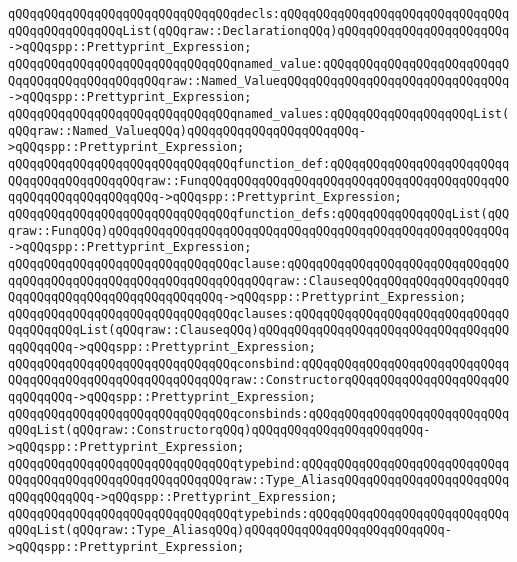 \verb|qQQqqQQqqQQqqQQqqQQqqQQqqQQqqQQqdecls:qQQqqQQqqQQqqQQqqQQqqQQqqQQqqQQqqQQqqQQqqQQqqQQqList(qQQqraw::DeclarationqQQq)qQQqqQQqqQQqqQQqqQQqqQQq->qQQqspp::Prettyprint_Expression;|\newline
\verb|qQQqqQQqqQQqqQQqqQQqqQQqqQQqqQQqnamed_value:qQQqqQQqqQQqqQQqqQQqqQQqqQQqqQQqqQQqqQQqqQQqqQQqraw::Named_ValueqQQqqQQqqQQqqQQqqQQqqQQqqQQqqQQq->qQQqspp::Prettyprint_Expression;|\newline
\verb|qQQqqQQqqQQqqQQqqQQqqQQqqQQqqQQqnamed_values:qQQqqQQqqQQqqQQqqQQqList(qQQqraw::Named_ValueqQQq)qQQqqQQqqQQqqQQqqQQqqQQq->qQQqspp::Prettyprint_Expression;|\newline
\verb|qQQqqQQqqQQqqQQqqQQqqQQqqQQqqQQqfunction_def:qQQqqQQqqQQqqQQqqQQqqQQqqQQqqQQqqQQqqQQqqQQqraw::FunqQQqqQQqqQQqqQQqqQQqqQQqqQQqqQQqqQQqqQQqqQQqqQQqqQQqqQQqqQQqqQQq->qQQqspp::Prettyprint_Expression;|\newline
\verb|qQQqqQQqqQQqqQQqqQQqqQQqqQQqqQQqfunction_defs:qQQqqQQqqQQqqQQqList(qQQqraw::FunqQQq)qQQqqQQqqQQqqQQqqQQqqQQqqQQqqQQqqQQqqQQqqQQqqQQqqQQqqQQq->qQQqspp::Prettyprint_Expression;|\newline
\verb|qQQqqQQqqQQqqQQqqQQqqQQqqQQqqQQqclause:qQQqqQQqqQQqqQQqqQQqqQQqqQQqqQQqqQQqqQQqqQQqqQQqqQQqqQQqqQQqqQQqqQQqraw::ClauseqQQqqQQqqQQqqQQqqQQqqQQqqQQqqQQqqQQqqQQqqQQqqQQqqQQq->qQQqspp::Prettyprint_Expression;|\newline
\verb|qQQqqQQqqQQqqQQqqQQqqQQqqQQqqQQqclauses:qQQqqQQqqQQqqQQqqQQqqQQqqQQqqQQqqQQqqQQqList(qQQqraw::ClauseqQQq)qQQqqQQqqQQqqQQqqQQqqQQqqQQqqQQqqQQqqQQqqQQq->qQQqspp::Prettyprint_Expression;|\newline
\verb|qQQqqQQqqQQqqQQqqQQqqQQqqQQqqQQqconsbind:qQQqqQQqqQQqqQQqqQQqqQQqqQQqqQQqqQQqqQQqqQQqqQQqqQQqqQQqqQQqraw::ConstructorqQQqqQQqqQQqqQQqqQQqqQQqqQQqqQQq->qQQqspp::Prettyprint_Expression;|\newline
\verb|qQQqqQQqqQQqqQQqqQQqqQQqqQQqqQQqconsbinds:qQQqqQQqqQQqqQQqqQQqqQQqqQQqqQQqList(qQQqraw::ConstructorqQQq)qQQqqQQqqQQqqQQqqQQqqQQq->qQQqspp::Prettyprint_Expression;|\newline
\verb|qQQqqQQqqQQqqQQqqQQqqQQqqQQqqQQqtypebind:qQQqqQQqqQQqqQQqqQQqqQQqqQQqqQQqqQQqqQQqqQQqqQQqqQQqqQQqqQQqraw::Type_AliasqQQqqQQqqQQqqQQqqQQqqQQqqQQqqQQqqQQq->qQQqspp::Prettyprint_Expression;|\newline
\verb|qQQqqQQqqQQqqQQqqQQqqQQqqQQqqQQqtypebinds:qQQqqQQqqQQqqQQqqQQqqQQqqQQqqQQqList(qQQqraw::Type_AliasqQQq)qQQqqQQqqQQqqQQqqQQqqQQqqQQq->qQQqspp::Prettyprint_Expression;|\newline
\newline
